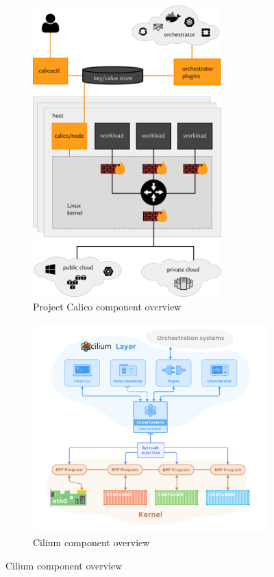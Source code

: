 \begin{figure}
    \centering
    \begin{subfigure}[b]{0.49\textwidth}
    \includegraphics[width=0.8\textwidth]{images/calico-arch}
    \caption{Project Calico component overview\cite{calico_about}}
    \label{fig:calico-arch}
    \end{subfigure}
    \begin{subfigure}[b]{0.49\textwidth}
    \includegraphics[width=\textwidth]{images/cilium-arch}
    \caption{Cilium component overview\cite{cilium_concepts}}
    \label{fig:cilium-arch}
    \end{subfigure}
\end{figure}

